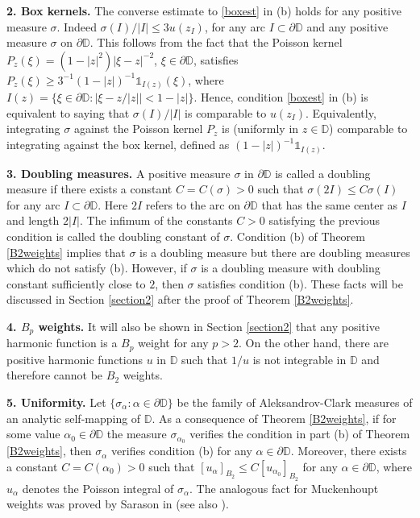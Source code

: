 \documentclass[a4paper,12pt]{article}
\theoremstyle{definition}
\numberwithin{equation}{section}
\newcommand{\D}{\mathbb D}
\begin{document}
\textbf{2. Box kernels.} The converse estimate to \eqref{boxest} in (b) holds for any positive measure $\sigma$. Indeed $\sigma (I) / |I| \leq 3 u (z_{I} )$, for any arc $I \subset \partial \mathbb{D}$ and any positive measure $\sigma$ on $\partial \mathbb{D}$. This follows from the fact that 
the Poisson kernel $P_z (\xi)= (1-|z|^2) |\xi - z|^{-2}$, $\xi \in \partial \D$, satisfies $P_z (\xi) \geq 3^{-1} (1-|z|)^{-1} {\mathbb{1}}_{I(z)} (\xi)$, where $I(z) = \{\xi \in \partial \D : |\xi - z/|z|| < 1-|z|\}$. Hence, condition \eqref{boxest} in (b) is equivalent to saying that $\sigma (I) / |I|$ is comparable to $u(z_I)$.
Equivalently, integrating $\sigma$ against the Poisson kernel $P_z $ is (uniformly in $z \in \D$) comparable to integrating against the box kernel, defined as $(1-|z|)^{-1} {\mathbb{1}}_{I(z)}$.   

\textbf{3. Doubling measures.} A positive measure $\sigma$ in $\partial \D$ is called a doubling measure if there exists a constant $C=C(\sigma) >0$ such that $\sigma (2I) \leq C \sigma (I)$ for any arc $I \subset \partial \D$. Here $2I$ refers to the arc on $\partial \D$ that has the same center as $I$ and length $ 2|I|$. The infimum of the constants $C>0$ satisfying the previous condition is called the doubling constant of $\sigma$. Condition (b) of Theorem \ref{B2weights} implies that $\sigma$ is a doubling measure but there are doubling measures which do not satisfy (b). However, if $\sigma$ is a doubling measure with doubling constant sufficiently close to $2$, then $\sigma$ satisfies condition (b). These facts will be discussed in Section \ref{section2} after the proof of Theorem \ref{B2weights}. 

\textbf{4. $B_p$ weights. } It will also be shown in Section \ref{section2} that any positive harmonic function is a $B_{p}$ weight for any $p>2$. On the other hand, there are positive harmonic functions $u$ in $\mathbb{D}$ such that $1 / u $ is not integrable in $\mathbb{D}$ and therefore cannot be  $B_{2}$ weights.

\textbf{5. Uniformity.} Let $\{\sigma_\alpha : \alpha \in \partial \D\}$ be the family of Aleksandrov-Clark measures of an analytic self-mapping of $\D$. As a consequence of Theorem \ref{B2weights}, if for some value $\alpha_0 \in \partial \D$ the measure $\sigma_{\alpha_0}$ verifies the condition in part (b)  of Theorem \ref{B2weights}, then $\sigma_\alpha$ verifies condition (b) for any $\alpha \in \partial \D$. Moreover, there exists a constant $C= C(\alpha_0) >0$ such that $[u_\alpha]_{B_2} \leq C [u_{\alpha_0}]_{B_2}$ for any $\alpha \in \partial \D$, where $u_\alpha$ denotes the Poisson integral of $\sigma_\alpha$. The analogous fact for Muckenhoupt weights was proved by Sarason in \cite{Sar} (see also \cite{AAD}).     
\end{document}
